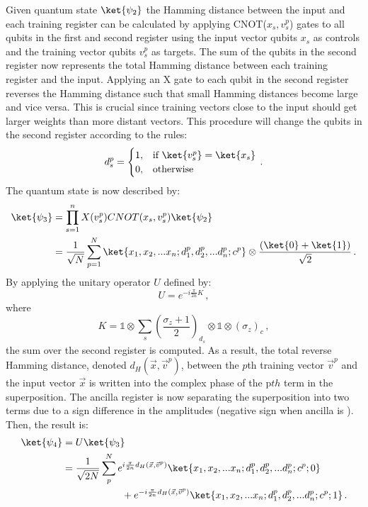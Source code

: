 Given quantum state $\ket{\psi_2}$ the Hamming distance between the input and each training register can be calculated by applying CNOT($x_s,v_s^p$) gates to all qubits in the first and second register using the input vector qubits $x_s$ as controls and the training vector qubits $v_s^p$ as targets. The sum of the qubits in the second register now represents the total Hamming distance between each training register and the input. Applying an X gate to each qubit in the second register reverses the Hamming distance such that small Hamming distances become large and vice versa. This is crucial since training vectors close to the input should get larger weights than more distant vectors. This procedure will change the qubits in the second register according to the rules:
\begin{equation}
\label{equ:distancerules}
d^p_s =
    \begin{cases}
      1, & \text{if}\ \ket{v_s^p} = \ket{x_s} \\
      0, & \text{otherwise}
    \end{cases}\, .
\end{equation}
The quantum state is now described by:
\begin{align}
\ket{\psi_3} &= \prod_{s=1}^n X(v^p_s)CNOT(x_s,v^p_s)\ket{\psi_2}\notag\\
&= \frac{1}{\sqrt{N}}\sum_{p=1}^N \ket{x_1,x_2,...x_n;d_1^p,d_2^p,...d_n^p;c^p} \otimes \frac{(\ket{0}+\ket{1})}{\sqrt{2}}\, .
\end{align}
By applying the unitary operator $U$ defined by:
\begin{equation}
\label{equ:sumoperator}
U = e^{-i\frac{\pi}{2n}K}\, ,
\end{equation}
where
\begin{equation}
\label{equ:sumoperator2}
K = \mathbb{1} \otimes \sum_s (\frac{\sigma_z+1}{2})_{d_s} \otimes \mathbb{1} \otimes (\sigma_z)_c \, ,
\end{equation}
the sum over the second register is computed. As a result, the total reverse Hamming distance, denoted $d_H(\vec{x},\vec{v}^p)$, between the $p$th training vector $\vec{v}^p$ and the input vector $\vec{x}$ is written into the complex phase of the p$th$ term in the superposition. The ancilla register is now separating the superposition into two terms due to a sign difference in the amplitudes (negative sign when ancilla is \1). Then, the result is:
\begin{align}
\ket{\psi_4} &= U\ket{\psi_3}\notag\\
&= \frac{1}{\sqrt{2N}}\sum_p^N e^{i\frac{\pi}{2n}d_H(\vec{x},\vec{v}^p)} \ket{x_1,x_2,...x_n;d_1^p,d_2^p,...d_n^p;c^p;0} \notag\\
&\quad\quad\quad\quad\quad\quad + e^{-i\frac{\pi}{2n}d_H(\vec{x},\vec{v}^p)} \ket{x_1,x_2,...x_n;d_1^p,d_2^p,...d_n^p;c^p;1}\, .
\end{align}
